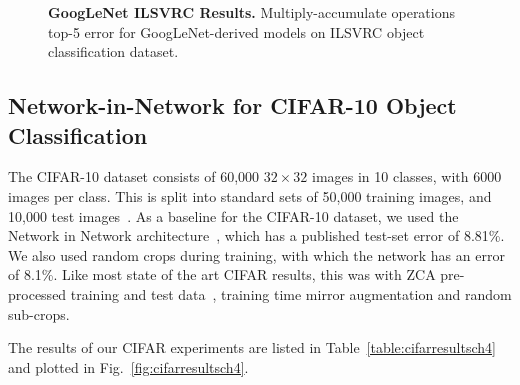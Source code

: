 \documentclass[thesis]{subfiles}
\begin{document}
    \begin{figure}[tbp] 
        \centering
        \datatable
        
        
        \caption{\textbf{GoogLeNet ILSVRC Results.} Multiply-accumulate operations \vs top-5 error for GoogLeNet-derived models on ILSVRC object classification dataset.}
        \label{fig:googlenetimagenetresults}
    \end{figure}
    
    \subsection{Network-in-Network for CIFAR-10 Object Classification}
    The CIFAR-10 dataset consists of 60,000 $32\times 32$ images in 10 classes, with 6000 images per class. This is split into standard sets of 50,000 training images, and 10,000 test images~\citep{CIFAR10}. As a baseline for the CIFAR-10 dataset, we used the Network in Network architecture~\citep{Lin2014}, which has a published test-set error of 8.81\%. We also used random crops during training, with which the network has an error of 8.1\%. Like most state of the art CIFAR results, this was with ZCA pre-processed training and test data~\citep{goodfellow2013maxout}, training time mirror augmentation and random sub-crops. 
    
    The results of our CIFAR experiments are listed in Table~\ref{table:cifarresultsch4} and plotted in Fig.~\ref{fig:cifarresultsch4}.
    
\end{document}
